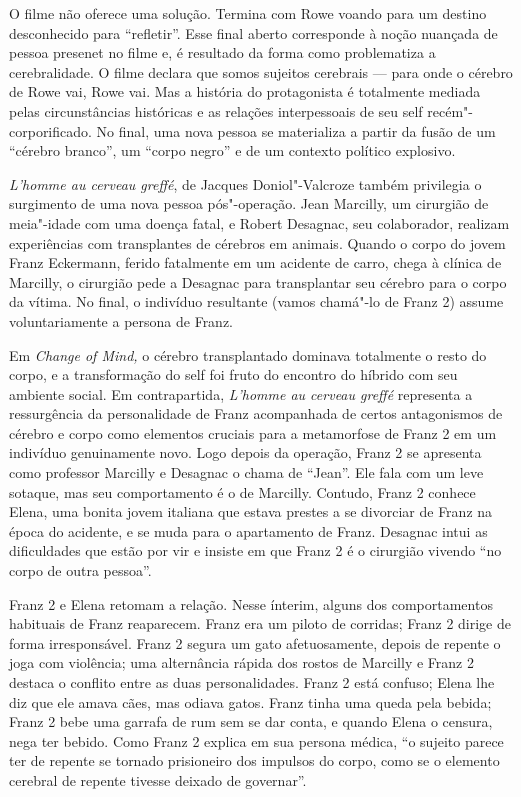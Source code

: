 O filme não oferece uma solução. Termina com Rowe voando para um destino
desconhecido para ``refletir''. Esse final aberto corresponde à noção
nuançada de pessoa presenet no filme e, é resultado da forma como
problematiza a cerebralidade. O filme declara que somos sujeitos
cerebrais --- para onde o cérebro de Rowe vai, Rowe vai. Mas a história
do protagonista é totalmente mediada pelas circunstâncias históricas e
as relações interpessoais de seu self recém"-corporificado. No final, uma
nova pessoa se materializa a partir da fusão de um ``cérebro branco'',
um ``corpo negro'' e de um contexto político explosivo.

\emph{L'homme au cerveau greffé}, de Jacques Doniol"-Valcroze também
privilegia o surgimento de uma nova pessoa pós"-operação. Jean Marcilly,
um cirurgião de meia"-idade com uma doença fatal, e Robert Desagnac, seu
colaborador, realizam experiências com transplantes de cérebros em
animais. Quando o corpo do jovem Franz Eckermann, ferido fatalmente em
um acidente de carro, chega à clínica de Marcilly, o cirurgião pede a
Desagnac para transplantar seu cérebro para o corpo da vítima. No final,
o indivíduo resultante (vamos chamá"-lo de Franz 2) assume
voluntariamente a persona de Franz.

Em \emph{Change of Mind,} o cérebro transplantado dominava totalmente o
resto do corpo, e a transformação do self foi fruto do encontro do
híbrido com seu ambiente social. Em contrapartida, \emph{L'homme au
cerveau greffé} representa a ressurgência da personalidade de Franz
acompanhada de certos antagonismos de cérebro e corpo como elementos
cruciais para a metamorfose de Franz 2 em um indivíduo genuinamente
novo. Logo depois da operação, Franz 2 se apresenta como professor
Marcilly e Desagnac o chama de ``Jean''. Ele fala com um leve sotaque,
mas seu comportamento é o de Marcilly. Contudo, Franz 2 conhece Elena,
uma bonita jovem italiana que estava prestes a se divorciar de Franz na
época do acidente, e se muda para o apartamento de Franz. Desagnac intui
as dificuldades que estão por vir e insiste em que Franz 2 é o cirurgião
vivendo ``no corpo de outra pessoa''.

Franz 2 e Elena retomam a relação. Nesse ínterim, alguns dos
comportamentos habituais de Franz reaparecem. Franz era um piloto de
corridas; Franz 2 dirige de forma irresponsável. Franz 2 segura um gato
afetuosamente, depois de repente o joga com violência; uma alternância
rápida dos rostos de Marcilly e Franz 2 destaca o conflito entre as duas
personalidades. Franz 2 está confuso; Elena lhe diz que ele amava cães,
mas odiava gatos. Franz tinha uma queda pela bebida; Franz 2 bebe uma
garrafa de rum sem se dar conta, e quando Elena o censura, nega ter
bebido. Como Franz 2 explica em sua persona médica, ``o sujeito parece
ter de repente se tornado prisioneiro dos impulsos do corpo, como se o
elemento cerebral de repente tivesse deixado de governar''.

